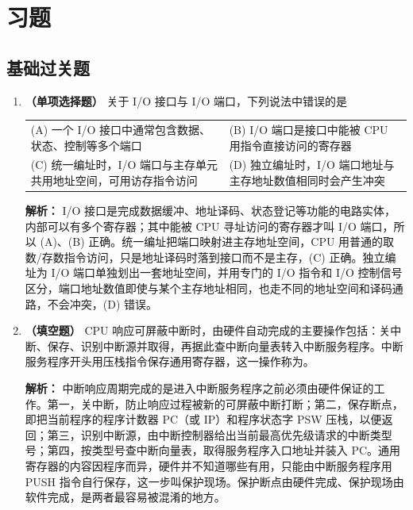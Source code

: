 \section{习题}

\subsection{基础过关题}

\begin{enumerate}

\item \textbf{（单项选择题）} 关于 I/O 接口与 I/O 端口，下列说法中错误的是
\begin{center}
\begin{tabularx}{0.96\linewidth}{@{}X X@{}}
(A) 一个 I/O 接口中通常包含数据、状态、控制等多个端口 & (B) I/O 端口是接口中能被 CPU 用指令直接访问的寄存器 \\[4pt]
(C) 统一编址时，I/O 端口与主存单元共用地址空间，可用访存指令访问 & (D) 独立编址时，I/O 端口地址与主存地址数值相同时会产生冲突
\end{tabularx}
\end{center}

\ifshowsolutions\par\noindent\textbf{解析：} I/O 接口是完成数据缓冲、地址译码、状态登记等功能的电路实体，内部可以有多个寄存器；其中能被 CPU 寻址访问的寄存器才叫 I/O 端口，所以 (A)、(B) 正确。统一编址把端口映射进主存地址空间，CPU 用普通的取数/存数指令访问，只是地址译码时落到接口而不是主存，(C) 正确。独立编址为 I/O 端口单独划出一套地址空间，并用专门的 I/O 指令和 I/O 控制信号区分，端口地址数值即使与某个主存地址相同，也走不同的地址空间和译码通路，不会冲突，(D) 错误。\else \answerarea \fi

\item \textbf{（填空题）} CPU 响应可屏蔽中断时，由硬件自动完成的主要操作包括：关中断、保存\underline{\qquad\qquad}、识别中断源并取得\underline{\qquad\qquad}，再据此查中断向量表转入中断服务程序。中断服务程序开头用压栈指令保存通用寄存器，这一操作称为\underline{\qquad\qquad}。

\ifshowsolutions\par\noindent\textbf{解析：} 中断响应周期完成的是进入中断服务程序之前必须由硬件保证的工作。第一，关中断，防止响应过程被新的可屏蔽中断打断；第二，保存断点，即把当前程序的程序计数器 PC（或 IP）和程序状态字 PSW 压栈，以便返回；第三，识别中断源，由中断控制器给出当前最高优先级请求的中断类型号；第四，按类型号查中断向量表，取得服务程序入口地址并装入 PC。通用寄存器的内容因程序而异，硬件并不知道哪些有用，只能由中断服务程序用 PUSH 指令自行保存，这一步叫保护现场。保护断点由硬件完成、保护现场由软件完成，是两者最容易被混淆的地方。\else \answerarea \fi


\end{enumerate}
